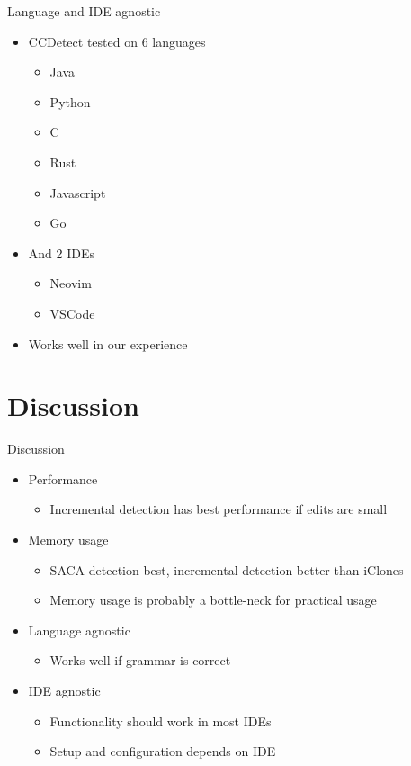 \documentclass[aspectratio=1610, xcolor=table]{beamer}
\begin{document}
\begin{frame}{Language and IDE agnostic}
    \begin{itemize}
        \item CCDetect tested on 6 languages
            \begin{itemize}
                \item Java
                \item Python
                \item C
                \item Rust
                \item Javascript
                \item Go
            \end{itemize}
        \item And 2 IDEs
            \begin{itemize}
                \item Neovim
                \item VSCode
            \end{itemize}
        \item Works well in our experience
    \end{itemize}

\end{frame}
    
\section{Discussion}
\begin{frame}{Discussion}
    \begin{itemize}
        \item Performance
            \begin{itemize}
                \item Incremental detection has best performance if edits are small
            \end{itemize}
        \item Memory usage
            \begin{itemize}
                \item SACA detection best, incremental detection better than iClones
                \item Memory usage is probably a bottle-neck for practical usage
            \end{itemize}
        \item Language agnostic
            \begin{itemize}
                \item Works well if grammar is correct
            \end{itemize}
        \item IDE agnostic
            \begin{itemize}
                \item Functionality should work in most IDEs
                \item Setup and configuration depends on IDE
            \end{itemize}
    \end{itemize}
\end{frame}
\end{document}

